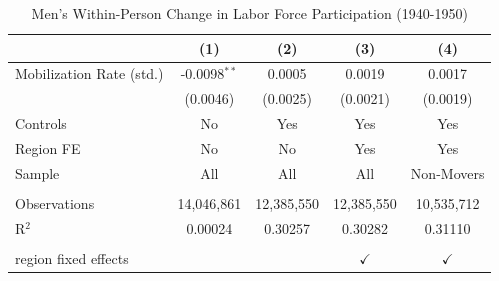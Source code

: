 
\begin{table}[htbp]
   \caption{\label{tab:men_main} Men's Within-Person Change in Labor Force Participation (1940-1950)}
   \bigskip
   \centering
   \begin{tabular}{lcccc}
      \toprule
                               & (1)            & (2)        & (3)           & (4)\\  
      \midrule 
      Mobilization Rate (std.) & -0.0098$^{**}$ & 0.0005     & 0.0019        & 0.0017\\   
                               & (0.0046)       & (0.0025)   & (0.0021)      & (0.0019)\\   
      Controls                 & No             & Yes        & Yes           & Yes\\  
      Region FE                & No             & No         & Yes           & Yes\\  
      Sample                   & All            & All        & All           & Non-Movers\\  
       \\
      Observations             & 14,046,861     & 12,385,550 & 12,385,550    & 10,535,712\\  
      R$^2$                    & 0.00024        & 0.30257    & 0.30282       & 0.31110\\  
       \\
      region fixed effects     &                &            & $\checkmark$  & $\checkmark$\\   
      \bottomrule
   \end{tabular}
\end{table}


